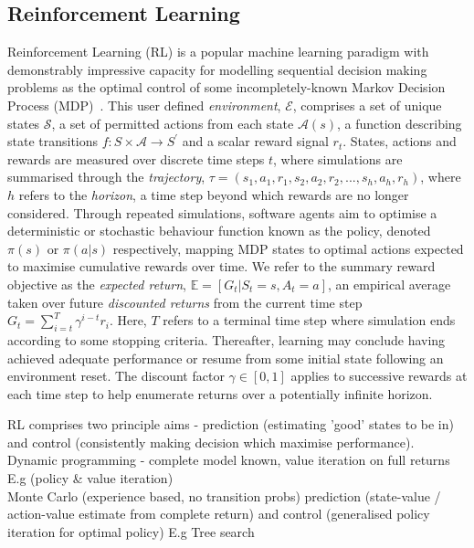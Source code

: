 \documentclass[conference,compsoc]{IEEEtran}
\begin{document}
\subsection{Reinforcement Learning}
Reinforcement Learning (RL) is a popular machine learning paradigm with demonstrably impressive capacity for modelling sequential decision making problems as the optimal control of some incompletely-known Markov Decision Process (MDP)~\cite{sutton2018reinforcement}. This user defined \textit{environment}, $\mathcal{E}$, comprises a set of unique states $\mathcal{S}$, a set of permitted actions from each state $\mathcal{A}(s)$, a function describing state transitions $f : S \times \mathcal{A} \to S^{\prime}$ and a scalar reward signal $r_t$. States, actions and rewards are measured over discrete time steps $t$, where simulations are summarised through the \textit{trajectory}, $\tau = (s_1, a_1, r_1,  s_2, a_2, r_2,...,s_h, a_h, r_h)$, where $h$ refers to the \textit{horizon}, a time step beyond which rewards are no longer considered. Through repeated simulations, software agents aim to optimise a deterministic or stochastic behaviour function known as the policy, denoted $\pi(s)$ or  $\pi(a|s)$ respectively, mapping MDP states to optimal actions expected to maximise cumulative rewards over time. We refer to the summary reward objective as the \textit{expected return}, $\mathbb{E}=[G_t | S_t = s, A_t = a]$, an empirical average taken over future \textit{discounted returns} from the current time step $G_{t} = \sum_{i=t}^{T}\gamma^{i-t}r_{i}$. Here, $T$ refers to a terminal time step where simulation ends according to some stopping criteria. Thereafter, learning may conclude having achieved adequate performance or resume from some initial state following an environment reset. The discount factor $\gamma \in [0,1]$ applies to successive rewards at each time step to help enumerate returns over a potentially infinite horizon. 

RL comprises two principle aims - prediction (estimating 'good' states to be in) and control (consistently making decision which maximise performance).\\

Dynamic programming - complete model known, value iteration on full returns
E.g (policy \& value iteration)\\


Monte Carlo (experience based, no transition probs) prediction (state-value / action-value estimate from complete return) and control (generalised policy iteration for optimal policy)
E.g Tree search\\
\end{document}
